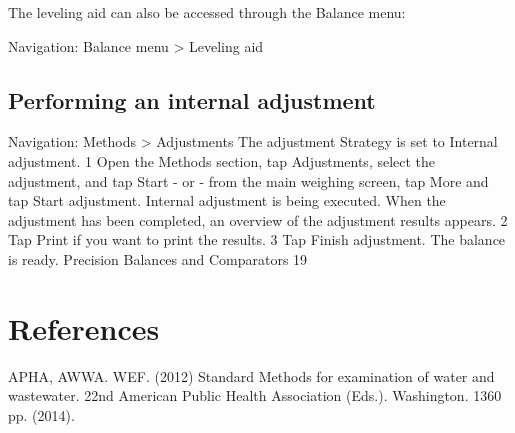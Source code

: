 \documentclass[12pt]{../SOP4_alpha}\usepackage[]{graphicx}\usepackage[]{xcolor}
\begin{document}
\NP The leveling aid can also be accessed through the Balance menu:

Navigation: Balance menu > Leveling aid

\subsection{Performing an internal adjustment}

Navigation: Methods > Adjustments
The adjustment Strategy is set to Internal adjustment.
1 Open the Methods section, tap Adjustments, select the adjustment, and tap Start
- or -
from the main weighing screen, tap More and tap Start adjustment.
Internal adjustment is being executed.
When the adjustment has been completed, an overview of the adjustment results appears.
2 Tap Print if you want to print the results.
3 Tap Finish adjustment.
The balance is ready.
Precision Balances and Comparators 19

\section{References}

\NP APHA, AWWA. WEF. (2012) Standard Methods for examination of water and wastewater. 22nd American Public Health Association (Eds.). Washington. 1360 pp. (2014).
\end{document}
